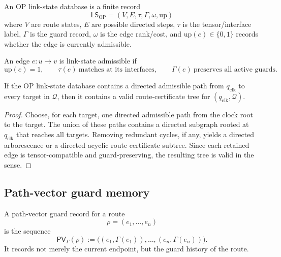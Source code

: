\begin{definition}
\label{def:v410r13-op-link-state-database}
An OP link-state database is a finite record
\[
 \mathsf{LS}_{\mathrm{OP}}
 =
 (V,E,\tau,\Gamma,\omega,\mathrm{up})
\]
where \(V\) are route states, \(E\) are possible directed steps, \(\tau\) is
the tensor/interface label, \(\Gamma\) is the guard record, \(\omega\) is the
edge rank/cost, and \(\mathrm{up}(e)\in\{0,1\}\) records whether the edge is
currently admissible.
\end{definition}

\begin{definition}
\label{def:v410r13-link-state-admissible-edge}
An edge \(e:u\to v\) is link-state admissible if
\[
 \mathrm{up}(e)=1,
 \qquad
 \tau(e)\ \text{matches at its interfaces},
 \qquad
 \Gamma(e)\ \text{preserves all active guards}.
\]
\end{definition}

\begin{proposition}
\label{prop:v410r13-link-state-tree-extraction}
If the OP link-state database contains a directed admissible path from
\(q_{\mathrm{clk}}\) to every target in \(\mathcal Q\), then it contains a valid
route-certificate tree for \((q_{\mathrm{clk}},\mathcal Q)\).
\end{proposition}

\begin{proof}
Choose, for each target, one directed admissible path from the clock root to the
target. The union of these paths contains a directed subgraph rooted at
\(q_{\mathrm{clk}}\) that reaches all targets. Removing redundant cycles, if
any, yields a directed arborescence or a directed acyclic route certificate
subtree. Since each retained edge is tensor-compatible and guard-preserving,
the resulting tree is valid in the sense.
\end{proof}

\subsection{Path-vector guard memory}
\label{subsec:v410r13-path-vector-guard-memory}

\begin{definition}
\label{def:v410r13-path-vector-guard-record}
A path-vector guard record for a route
\[
 \rho=(e_1,\ldots,e_n)
\]
is the sequence
\[
 \mathsf{PV}_{\Gamma}(\rho)
 :=
 \bigl((e_1,\Gamma(e_1)),\ldots,(e_n,\Gamma(e_n))\bigr).
\]
It records not merely the current endpoint, but the guard history of the route.
\end{definition}

